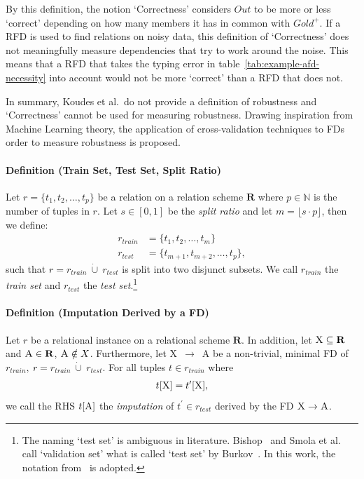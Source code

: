 By this definition, the notion `Correctness' considers \( Out \) to be more or less `correct' depending on how many members it has in common with \( Gold^{+} \).
If a RFD is used to find relations on noisy data, this definition of `Correctness' does not meaningfully measure dependencies that try to work around the noise.
This means that a RFD that takes the typing error in table~\ref{tab:example-afd-necessity} into account would not be more `correct' than a RFD that does not.

In summary, Koudes et al.\ do not provide a definition of robustness and `Correctness' cannot be used for measuring robustness.
Drawing inspiration from Machine Learning theory, the application of cross-validation techniques to FDs order to measure robustness is proposed.

\paragraph{Definition (Train Set, Test Set, Split Ratio)} Let \( r = \{ t_1, t_2, \dots, t_p \}\) be a  relation on a relation scheme \( \boldsymbol{R} \) where \( p \in \mathbb{N} \) is the number of tuples in \( r \).
Let \( s \in [0, 1] \) be the \emph{split ratio} and let \( m = \lfloor s \cdot p \rfloor \), then we define:
\begin{align}
    r_{train} &= \{ t_1, t_2, \dots, t_{m} \} \\
    r_{test} &= \{ t_{m + 1}, t_{m + 2}, \dots, t_{p} \},
\end{align}
such that \( r =  r_{train}~\dot\cup~r_{test} \) is split into two disjunct subsets.
We call \( r_{train} \) the \emph{train set} and \( r_{test} \) the \emph{test set}.\footnote{The naming `test set' is ambiguous in literature. Bishop~\cite{BIS06} and Smola et al.\ \cite{SMO08} call `validation set' what is called `test set' by Burkov~\cite[ch.~5, p.~8-9]{BUR19}. In this work, the notation from~\cite{BUR19} is adopted.}~\cite[p.~56]{SMO08}

\paragraph{Definition (Imputation Derived by a FD)}
Let \( r \) be a relational instance on a relational scheme \( \mathbf{R} \).
In addition, let \( \textsc{X} \subseteq \mathbf{R} \) and \( \textsc{A} \in \mathbf{R} \), \( \textsc{A} \notin X\).
Furthermore, let \textsc{X}~\( \rightarrow \)~\textsc{A} be a non-trivial, minimal FD of \( r_{train},~r = r_{train}~\dot\cup~r_{test} \).
For all tuples \( t \in r_{train} \) where
\begin{align}\label{eq:fd-imputation}
    t[\textsc{X}] = t^{\prime}[\textsc{X}],
\end{align}
we call the RHS \( t[\textsc{A}] \) the \emph{imputation} of \( t^{\prime} \in r_{test} \) derived by the FD \( \textsc{X} \rightarrow \textsc{A} \).

